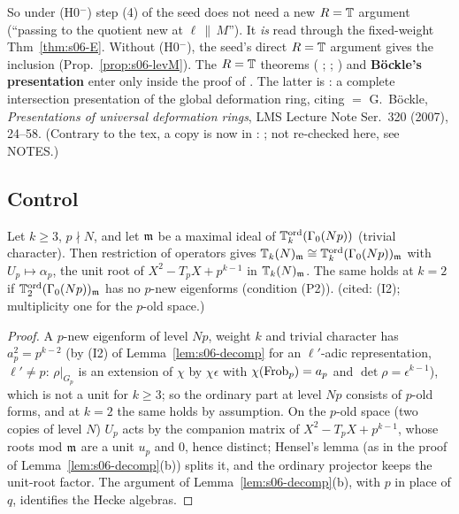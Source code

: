 \noindent So under (H0$^-$) step (4) of the seed does not need a new $R=\mathbb{T}$ argument (``passing to the quotient new at $\ell\,\|\,M$''). It
\emph{is} \cite[Thm~1.1]{KO} read through the fixed-weight Thm~\ref{thm:s06-E}. Without (H0$^-$), the seed's direct $R=\mathbb{T}$ argument gives the
inclusion (Prop.~\ref{prop:s06-levM}).  The $R=\mathbb{T}$ theorems (\cite[Thm~0.2 $=$ 3.7]{DFG}
; \cite[Thm~6.6]{Dim09}
; \cite[Thm~2.9, p.~5]{KO}) and
\textbf{B\"ockle's presentation} enter only inside the proof of \cite{KO}. The latter is \cite[Thm~3.12 (B\"ockle), p.~12]{KO}: a complete
intersection presentation of the global deformation ring, citing \cite[Cor.~4.3, Thm~5.8]{Boc07} $=$ G.~B\"ockle, \emph{Presentations of
universal deformation rings}, LMS Lecture Note Ser.\ 320 (2007), 24--58. (Contrary to the tex, a copy is now in
: ; not re-checked here, see NOTES.)

\subsection{Control}
\begin{lemma}\label{lem:s06-pstab}
Let $k\ge3$, $p\nmid N$, and let $\mathfrak{m}$ be a maximal ideal of $\mathbb{T}^{\mathrm{ord}}_k(\Gamma_0(Np))$ (trivial character). Then restriction of
operators gives $\mathbb{T}_k(N)_{\mathfrak{m}}\cong\mathbb{T}^{\mathrm{ord}}_k(\Gamma_0(Np))_{\mathfrak{m}}$ with $U_p\mapsto\alpha_p$, the unit root of $X^2-T_pX+p^{k-1}$ in
$\mathbb{T}_k(N)_{\mathfrak{m}}$. The same holds at $k=2$ if $\mathbb{T}^{\mathrm{ord}}_2(\Gamma_0(Np))_{\mathfrak{m}}$ has no $p$-new eigenforms (condition (P2)). \stpmc{} (cited: (I2); multiplicity one for the $p$-old space.)
\end{lemma}
\begin{proof}
A $p$-new eigenform of level $Np$, weight $k$ and trivial character has $a_p^2=p^{k-2}$ (by (I2) of Lemma~\ref{lem:s06-decomp} for an $\ell'$-adic
representation, $\ell'\ne p$: $\rho|_{G_p}$ is an extension of $\chi$ by $\chi\epsilon$ with $\chi(\mathrm{Frob}_p)=a_p$ and $\det\rho=\epsilon^{k-1}$), which is not a unit for $k\ge3$; so the ordinary part at level $Np$
consists of $p$-old forms, and at $k=2$ the same holds by assumption. On the $p$-old space (two copies of level $N$) $U_p$ acts by the
companion matrix of $X^2-T_pX+p^{k-1}$, whose roots mod $\mathfrak{m}$ are a unit $u_p$ and $0$, hence distinct; Hensel's lemma (as in the
proof of Lemma~\ref{lem:s06-decomp}(b)) splits it, and the ordinary projector keeps the unit-root factor. The argument of
Lemma~\ref{lem:s06-decomp}(b), with $p$ in place of $q$, identifies the Hecke algebras.
\end{proof}

